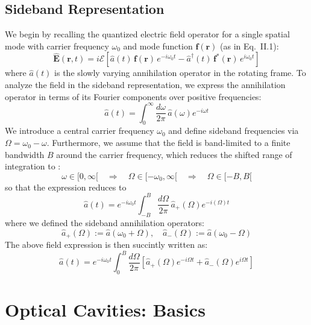 \subsection{Sideband Representation}
We begin by recalling the quantized electric field operator for a single spatial mode with carrier frequency $\omega_0$ and mode function $\mathbf{f}(\mathbf{r})$ (as in Eq.~II.1):
\begin{equation}
\hat{\mathbf{E}}(\mathbf{r}, t) = i \mathcal{E} \left[ \hat{a}(t)\, \mathbf{f}(\mathbf{r})\, e^{-i \omega_0 t} - \hat{a}^\dagger(t)\, \mathbf{f}^*(\mathbf{r})\, e^{i \omega_0 t} \right]
\end{equation}
where $\hat{a}(t)$ is the slowly varying annihilation operator in the rotating frame.
To analyze the field in the sideband representation, we express the annihilation operator in terms of its Fourier components over positive frequencies:
\begin{equation}
\hat{a}(t) = \int_0^\infty \frac{d\omega}{2\pi} \, \hat{a}(\omega) e^{-i\omega t} 
\end{equation}
We introduce a central carrier frequency \( \omega_0 \) and define sideband frequencies via \( \Omega = \omega_0 - \omega \). Furthermore, we assume that the field is band-limited to a finite bandwidth \( B \) around the carrier frequency, which reduces the shifted range of integration to :
\[
\omega \in [0, \infty[ \quad \Rightarrow \quad \Omega \in [-\omega_0, \infty[ \quad \Rightarrow \quad \Omega \in [-B, B[
\]
so that the expression reduces to 
\begin{equation}
\hat{a}(t) 
= e^{-i \omega_0 t }\int_{-B}^{B} \frac{d\Omega}{2\pi} \, \hat{a}_+(\Omega)  e^{-i(\Omega)t}
\end{equation}
where we defined the sideband annihilation operators:
\begin{equation}
\hat{a}_+(\Omega) := \hat{a}(\omega_0 + \Omega), \quad
\hat{a}_-(\Omega) := \hat{a}(\omega_0 - \Omega)
\end{equation}
The above field expression is then succintly written as: 
\begin{equation}
  \hat{a}(t) = e^{-i \omega_0 t }\int_{0}^{B} \frac{d\Omega}{2\pi} \left[ \hat{a}_+(\Omega) e^{-i\Omega t} + \hat{a}_-(\Omega) e^{i\Omega t} \right]
\end{equation}




\section{Optical Cavities: Basics}
